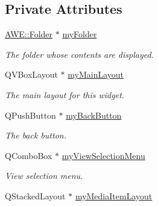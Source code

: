 \subsection*{Private Attributes}
\begin{DoxyCompactItemize}
\item 
\hypertarget{class_u_i_1_1_folder_pane_a463ba66c283f13d5d0e50def80715245}{\hyperlink{class_a_w_e_1_1_folder}{A\-W\-E\-::\-Folder} $\ast$ \hyperlink{class_u_i_1_1_folder_pane_a463ba66c283f13d5d0e50def80715245}{my\-Folder}}\label{class_u_i_1_1_folder_pane_a463ba66c283f13d5d0e50def80715245}

\begin{DoxyCompactList}\small\item\em The folder whose contents are displayed. \end{DoxyCompactList}\item 
\hypertarget{class_u_i_1_1_folder_pane_afe88da12cfbec111b9584c24ae42b970}{Q\-V\-Box\-Layout $\ast$ \hyperlink{class_u_i_1_1_folder_pane_afe88da12cfbec111b9584c24ae42b970}{my\-Main\-Layout}}\label{class_u_i_1_1_folder_pane_afe88da12cfbec111b9584c24ae42b970}

\begin{DoxyCompactList}\small\item\em The main layout for this widget. \end{DoxyCompactList}\item 
\hypertarget{class_u_i_1_1_folder_pane_ae96b0fce02e4a9b2c9eee60ec1138107}{Q\-Push\-Button $\ast$ \hyperlink{class_u_i_1_1_folder_pane_ae96b0fce02e4a9b2c9eee60ec1138107}{my\-Back\-Button}}\label{class_u_i_1_1_folder_pane_ae96b0fce02e4a9b2c9eee60ec1138107}

\begin{DoxyCompactList}\small\item\em The back button. \end{DoxyCompactList}\item 
\hypertarget{class_u_i_1_1_folder_pane_a45b4ef8854845973a2ec7fa74703b419}{Q\-Combo\-Box $\ast$ \hyperlink{class_u_i_1_1_folder_pane_a45b4ef8854845973a2ec7fa74703b419}{my\-View\-Selection\-Menu}}\label{class_u_i_1_1_folder_pane_a45b4ef8854845973a2ec7fa74703b419}

\begin{DoxyCompactList}\small\item\em View selection menu. \end{DoxyCompactList}\item 
\hypertarget{class_u_i_1_1_folder_pane_ae8030de2b414071532da8e664cc162f8}{Q\-Stacked\-Layout $\ast$ \hyperlink{class_u_i_1_1_folder_pane_ae8030de2b414071532da8e664cc162f8}{my\-Media\-Item\-Layout}}\label{class_u_i_1_1_folder_pane_ae8030de2b414071532da8e664cc162f8}


\end{DoxyCompactItemize}
